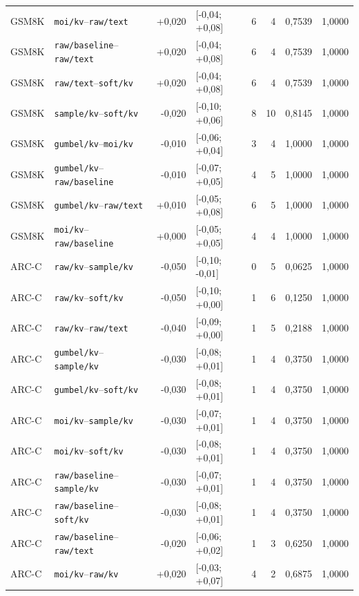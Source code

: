 \begin{longtable}{llrlrrrr}
GSM8K & \texttt{moi/kv}--\texttt{raw/text} & +0,020 & [-0,04; +0,08] & 6 & 4 & 0,7539 & 1,0000 \\
GSM8K & \texttt{raw/baseline}--\texttt{raw/text} & +0,020 & [-0,04; +0,08] & 6 & 4 & 0,7539 & 1,0000 \\
GSM8K & \texttt{raw/text}--\texttt{soft/kv} & +0,020 & [-0,04; +0,08] & 6 & 4 & 0,7539 & 1,0000 \\
GSM8K & \texttt{sample/kv}--\texttt{soft/kv} & -0,020 & [-0,10; +0,06] & 8 & 10 & 0,8145 & 1,0000 \\
GSM8K & \texttt{gumbel/kv}--\texttt{moi/kv} & -0,010 & [-0,06; +0,04] & 3 & 4 & 1,0000 & 1,0000 \\
GSM8K & \texttt{gumbel/kv}--\texttt{raw/baseline} & -0,010 & [-0,07; +0,05] & 4 & 5 & 1,0000 & 1,0000 \\
GSM8K & \texttt{gumbel/kv}--\texttt{raw/text} & +0,010 & [-0,05; +0,08] & 6 & 5 & 1,0000 & 1,0000 \\
GSM8K & \texttt{moi/kv}--\texttt{raw/baseline} & +0,000 & [-0,05; +0,05] & 4 & 4 & 1,0000 & 1,0000 \\
\hline
ARC-C & \texttt{raw/kv}--\texttt{sample/kv} & -0,050 & [-0,10; -0,01] & 0 & 5 & 0,0625 & 1,0000 \\
ARC-C & \texttt{raw/kv}--\texttt{soft/kv} & -0,050 & [-0,10; +0,00] & 1 & 6 & 0,1250 & 1,0000 \\
ARC-C & \texttt{raw/kv}--\texttt{raw/text} & -0,040 & [-0,09; +0,00] & 1 & 5 & 0,2188 & 1,0000 \\
ARC-C & \texttt{gumbel/kv}--\texttt{sample/kv} & -0,030 & [-0,08; +0,01] & 1 & 4 & 0,3750 & 1,0000 \\
ARC-C & \texttt{gumbel/kv}--\texttt{soft/kv} & -0,030 & [-0,08; +0,01] & 1 & 4 & 0,3750 & 1,0000 \\
ARC-C & \texttt{moi/kv}--\texttt{sample/kv} & -0,030 & [-0,07; +0,01] & 1 & 4 & 0,3750 & 1,0000 \\
ARC-C & \texttt{moi/kv}--\texttt{soft/kv} & -0,030 & [-0,08; +0,01] & 1 & 4 & 0,3750 & 1,0000 \\
ARC-C & \texttt{raw/baseline}--\texttt{sample/kv} & -0,030 & [-0,07; +0,01] & 1 & 4 & 0,3750 & 1,0000 \\
ARC-C & \texttt{raw/baseline}--\texttt{soft/kv} & -0,030 & [-0,08; +0,01] & 1 & 4 & 0,3750 & 1,0000 \\
ARC-C & \texttt{raw/baseline}--\texttt{raw/text} & -0,020 & [-0,06; +0,02] & 1 & 3 & 0,6250 & 1,0000 \\
ARC-C & \texttt{moi/kv}--\texttt{raw/kv} & +0,020 & [-0,03; +0,07] & 4 & 2 & 0,6875 & 1,0000 \\

\end{longtable}
